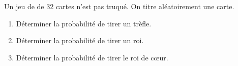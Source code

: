 
Un jeu de de 32 cartes n'est pas truqué. On titre aléatoirement une carte.
\begin{enumerate}
\item Déterminer la probabilité de tirer un trèfle.
\item Déterminer la probabilité de tirer un roi.
\item Déterminer la probabilité de tirer le roi de cœur.
\end{enumerate}
